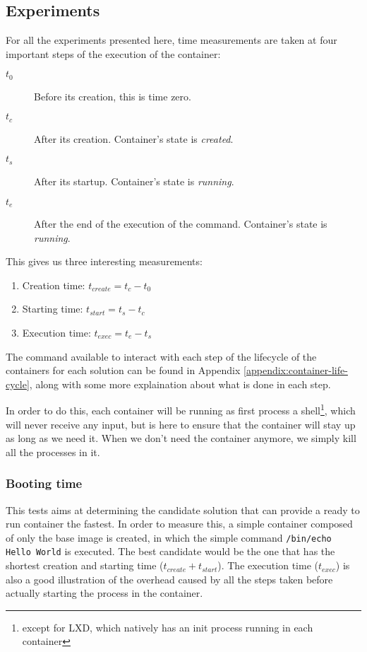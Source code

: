 \subsection{Experiments} \label{subs:experiments}
For all the experiments presented here, time measurements are taken at four important steps of the execution of the container:
\begin{description}
  \item[$t_0$] Before its creation, this is time zero.
  \item[$t_c$] After its creation. Container's state is \textit{created}.
  \item[$t_s$] After its startup. Container's state is \textit{running}.
  \item[$t_e$] After the end of the execution of the command. Container's state is \textit{running}.
\end{description}
This gives us three interesting measurements:
\begin{enumerate}
  \item Creation time: $t_{create}=t_c - t_0$
  \item Starting time: $t_{start}=t_s - t_c$
  \item Execution time: $t_{exec}=t_e - t_s$
\end{enumerate}

The command available to interact with each step of the lifecycle of the containers for each solution can be found in Appendix \ref{appendix:container-life-cycle}, along with some more explaination about what is done in each step.

In order to do this, each container will be running as first process a shell\footnote{except for LXD, which natively has an init process running in each container}, which will never receive any input, but is here to ensure that the container will stay up as long as we need it.  When we don't need the container anymore, we simply kill all the processes in it.

\subsubsection{Booting time}
This tests aims at determining the candidate solution that can provide a ready to run container the fastest.  In order to measure this, a simple container composed of only the base image is created, in which the simple command \texttt{/bin/echo Hello World} is executed.  The best candidate would be the one that has the shortest creation and starting time ($t_{create} + t_{start}$).  The execution time ($t_{exec}$) is also a good illustration of the overhead caused by all the steps taken before actually starting the process in the container.

